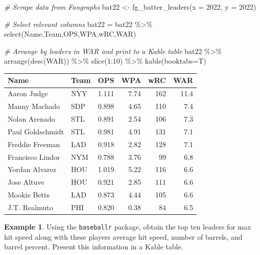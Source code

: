\documentclass[
  11pt,
]{book}
\newenvironment{Shaded}{\begin{snugshade}}{\end{snugshade}}
\newcommand{\AttributeTok}[1]{\textcolor[rgb]{0.77,0.63,0.00}{#1}}
\newcommand{\CommentTok}[1]{\textcolor[rgb]{0.56,0.35,0.01}{\textit{#1}}}
\newcommand{\DecValTok}[1]{\textcolor[rgb]{0.00,0.00,0.81}{#1}}
\newcommand{\FunctionTok}[1]{\textcolor[rgb]{0.00,0.00,0.00}{#1}}
\newcommand{\NormalTok}[1]{#1}
\newcommand{\OtherTok}[1]{\textcolor[rgb]{0.56,0.35,0.01}{#1}}
\newcommand{\SpecialCharTok}[1]{\textcolor[rgb]{0.00,0.00,0.00}{#1}}
\theoremstyle{definition}
\theoremstyle{definition}
\newtheorem{example}{Example}[chapter]
\theoremstyle{definition}
\theoremstyle{definition}
\theoremstyle{remark}
\begin{document}
\begin{Shaded}
\begin{Highlighting}[]
\CommentTok{\# Scrape data from Fangraphs}
\NormalTok{bat22 }\OtherTok{\textless{}{-}} \FunctionTok{fg\_batter\_leaders}\NormalTok{(}\AttributeTok{x =} \DecValTok{2022}\NormalTok{, }\AttributeTok{y =} \DecValTok{2022}\NormalTok{)}

\CommentTok{\# Select relevant columns}
\NormalTok{bat22 }\OtherTok{=}\NormalTok{ bat22 }\SpecialCharTok{\%\textgreater{}\%} 
  \FunctionTok{select}\NormalTok{(Name,Team,OPS,WPA,wRC,WAR)}

\CommentTok{\# Arrange by leaders in WAR and print to a Kable table}
\NormalTok{bat22 }\SpecialCharTok{\%\textgreater{}\%} 
  \FunctionTok{arrange}\NormalTok{(}\FunctionTok{desc}\NormalTok{(WAR)) }\SpecialCharTok{\%\textgreater{}\%} 
  \FunctionTok{slice}\NormalTok{(}\DecValTok{1}\SpecialCharTok{:}\DecValTok{10}\NormalTok{) }\SpecialCharTok{\%\textgreater{}\%} 
  \FunctionTok{kable}\NormalTok{(}\AttributeTok{booktabs=}\NormalTok{T)}
\end{Highlighting}
\end{Shaded}

\begin{tabular}{llrrrr}
\toprule
Name & Team & OPS & WPA & wRC & WAR\\
\midrule
Aaron Judge & NYY & 1.111 & 7.74 & 162 & 11.4\\
Manny Machado & SDP & 0.898 & 4.65 & 110 & 7.4\\
Nolan Arenado & STL & 0.891 & 2.54 & 106 & 7.3\\
Paul Goldschmidt & STL & 0.981 & 4.91 & 131 & 7.1\\
Freddie Freeman & LAD & 0.918 & 2.82 & 128 & 7.1\\
\addlinespace
Francisco Lindor & NYM & 0.788 & 3.76 & 99 & 6.8\\
Yordan Alvarez & HOU & 1.019 & 5.22 & 116 & 6.6\\
Jose Altuve & HOU & 0.921 & 2.85 & 111 & 6.6\\
Mookie Betts & LAD & 0.873 & 4.44 & 105 & 6.6\\
J.T. Realmuto & PHI & 0.820 & 0.38 & 84 & 6.5\\
\bottomrule
\end{tabular}

\newpage

\begin{example}
Using the \texttt{baseballr} package, obtain the top ten leaders for max hit speed along with these players average hit speed, number of barrels, and barrel percent. Present this information in a Kable table.
\end{example}
\end{document}
